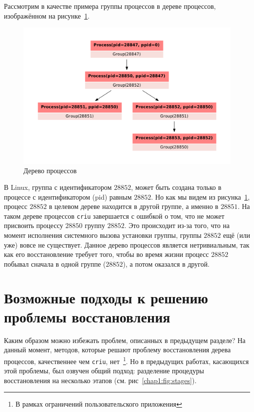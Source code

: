 \begin{exmp}
\label{chap1:exmp:criugroups}
Рассмотрим в качестве примера группы процессов в дереве процессов, изображённом на рисунке~\ref{chap1:fig:groupstree}.

\begin{figure}[ht!]
    \centering
    \includegraphics[scale=0.5]{fig/groups-pstree.pdf}
\caption{Дерево процессов}
\label{chap1:fig:groupstree}
\end{figure}

В Linux, группа с идентификатором $28852$, может быть создана только в процессе с идентификатором (pid) равным $28852$.
Но как мы видем из рисунка~\ref{chap1:fig:groupstree}, процесс $28852$ в целевом дереве находится в другой группе, а именно в $28851$. На таком дереве процессов \texttt{criu} завершается с ошибкой о том, что не может присвоить процессу $28850$ группу $28852$. Это происходит из-за того, что на момент исполнения системного вызова установки группы, группы $28852$ ещё (или уже) вовсе не существует. Данное дерево процессов является нетривиальным, так как его восстановление требует того, чтобы во время жизни процесс $28852$ побывал сначала в одной группе ($28852$), а потом оказался в другой.
\end{exmp}

\section{Возможные подходы к решению проблемы восстановления}
\label{chap1:sec:approaches}

Каким образом можно избежать проблем, описанных в предыдущем разделе? На данный момент, методов, которые решают проблему восстановления дерева процессов, качественнее чем \texttt{criu}, нет~\footnote{В рамках ограничений пользовательского приложения}. Но в предыдущих работах, касающихся этой проблемы, был озвучен общий подход: разделение процедуры восстановления на несколько этапов (см. рис~\ref{chap1:fig:stages}).

